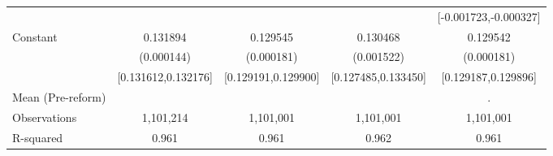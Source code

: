 {\begin{tabular}{l*{4}{c}}
                    &                     &                     &                     &[-0.001723,-0.000327]         \\
Constant            &    0.131894\sym{***}&    0.129545\sym{***}&    0.130468\sym{***}&    0.129542\sym{***}\\
                    &  (0.000144)         &  (0.000181)         &  (0.001522)         &  (0.000181)         \\
                    &[0.131612,0.132176]         &[0.129191,0.129900]         &[0.127485,0.133450]         &[0.129187,0.129896]         \\
\midrule
Mean (Pre-reform)   &                     &                     &                     &           .         \\
Observations        &   1,101,214         &   1,101,001         &   1,101,001         &   1,101,001         \\
R-squared           &       0.961         &       0.961         &       0.962         &       0.961         \\
\bottomrule
\end{tabular}
}
